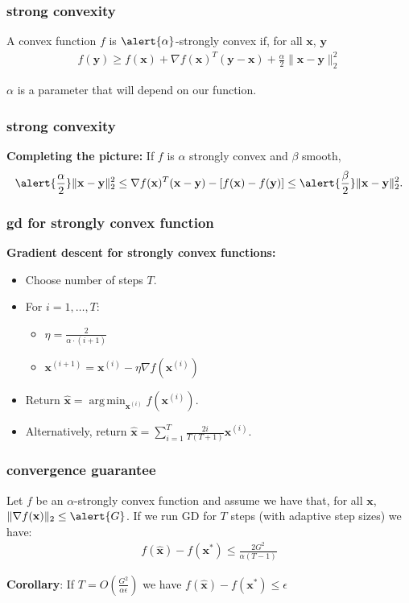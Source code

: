 \documentclass[compress]{beamer}
\newcommand{\bv}[1]{\mathbf{#1}}
\DeclareMathOperator*{\argmin}{arg\,min}
\begin{document}
\begin{frame}[t]
	\frametitle{strong convexity}
	\begin{definition}
		A convex function $f$ is $\alert{\alpha}$-strongly convex if, for all $\bv{x}$, $\bv{y}$
		\begin{align*}
		f(\bv{y}) \geq f(\bv{x}) + \nabla f(\bv{x})^T(\bv{y} - \bv{x}) + \frac{\alpha}{2} \|\bv{x} - \bv{y}\|_2^2
		\end{align*}
	\end{definition}
	$\alpha$ is a parameter that will depend on our function.
\end{frame}

\begin{frame}[t]
	\frametitle{strong convexity}
	\textbf{Completing the picture:}
	If $f$ is $\alpha$ strongly convex and $\beta$ smooth,
	\begin{align*}
	\alert{\frac{\alpha}{2}}\|\bv{x} - \bv{y}\|_2^2 \leq \nabla f(\bv{x})^T(\bv{x} - \bv{y}) - \left[f(\bv{x}) - f(\bv{y})\right] \leq \alert{\frac{\beta}{2}}\|\bv{x} - \bv{y}\|_2^2.
	\end{align*}
\end{frame}

\begin{frame}[t]
	\frametitle{gd for strongly convex function}
	\textbf{Gradient descent for strongly convex functions:}
	\begin{itemize}
		\item Choose number of steps $T$.
		\item For $i = 1,\ldots, T$:
		\begin{itemize}
			\item $\eta = \frac{2}{\alpha\cdot(i+1)}$
			\item $\bv{x}^{(i+1)} = \bv{x}^{(i)} - \eta \nabla f(\bv{x}^{(i)})$
		\end{itemize}
		\item Return $\hat{\bv{x}} = \argmin_{\bv{x}^{(i)}} f(\bv{x}^{(i)})$. 
		\item Alternatively, return $\hat{\bv{x}} = \sum_{i=1}^T \frac{2i}{T(T+1)} \bv{x}^{(i)}$.
	\end{itemize}
\end{frame}

\begin{frame}[t]
	\frametitle{convergence guarantee}
	\begin{theorem}
		Let $f$ be an \alert{$\alpha$}-strongly convex function and assume we have that, for all $\bv{x}$, $\|\nabla f(\bv{x})\|_2 \leq \alert{G}$. If we run GD for $T$ steps (with adaptive step sizes) we have:
		\begin{align*}
		f(\hat{\bv{x}}) - f(\bv{x}^*) \leq \frac{2G^2}{\alpha(T-1)} 
		\end{align*} 
	\end{theorem}
	\textbf{Corollary}: If \alert{$T = O\left(\frac{G^2}{\alpha \epsilon}\right)$} we have $f(\hat{\bv{x}}) - f(\bv{x}^*) \leq \epsilon$
\end{frame}
\end{document}
